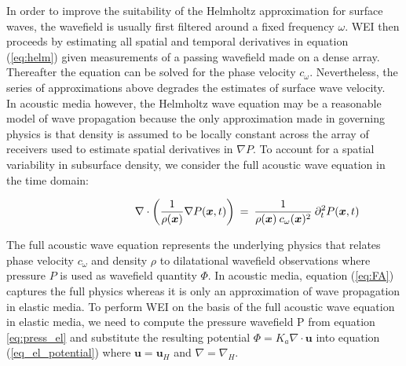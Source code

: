 \documentclass{article}
\begin{document}
	In order to improve the suitability of the Helmholtz approximation for surface waves, the wavefield is usually first filtered around a fixed frequency $\omega$. WEI then proceeds by estimating all spatial and temporal derivatives in equation (\ref{eq:helm}) given measurements of a passing wavefield made on a dense array. Thereafter the equation can be solved for the phase velocity $c_{\omega}$. Nevertheless, the series of approximations above degrades the estimates of surface wave velocity.\\ 
	
	In acoustic media however, the Helmholtz wave equation may be a reasonable model of wave propagation because the only approximation made in governing physics is that density is assumed to be locally constant across the array of receivers used to estimate spatial derivatives in $\nabla P$. To account for a spatial variability in subsurface density, we consider the full acoustic wave equation in the time domain:
	
	\begin{align}\label{eq:FA}
		\shoveright \shoveright \shoveright \shoveright \shoveright \shoveright \shoveright \shoveright %
		\; \; \; \nabla \cdot \bigg( \frac{1}{\rho(\bm{x})} \nabla P(\bm{x},t) \bigg) &\: = \: \frac{1}{\rho(\bm{x}) \: c_{\omega}(\bm{x})^{2}} \: \partial_{t}^{2} P(\bm{x},t)
	\end{align}

	The full acoustic wave equation represents the underlying physics that relates phase velocity $c_{\omega}$ and density $\rho$ to dilatational wavefield observations where pressure $P$ is used as wavefield quantity $\Phi$. In acoustic media, equation (\ref{eq:FA}) captures the full physics whereas it is only an approximation of wave propagation in elastic media. To perform WEI on the basis of the full acoustic wave equation in elastic media, we need to compute the pressure wavefield P from equation \eqref{eq:press_el} and substitute the resulting potential $\Phi = K_{a} \nabla \cdot \bm{u}$ into equation (\ref{eq_el_potential}) where $\bm{u} = \bm{u}_{H}$ and $\nabla = \nabla_{H}$.\\
	
\end{document}
